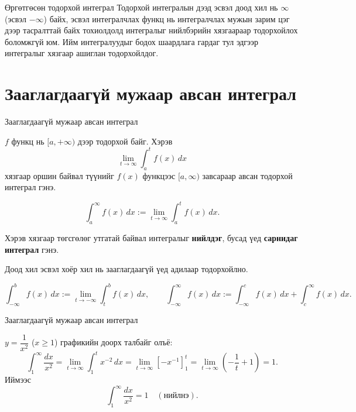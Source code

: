 

\begin{frame}[allowframebreaks]{Өргөтгөсөн тодорхой интеграл}
Тодорхой интегралын дээд эсвэл доод хил нь $\infty$ (эсвэл $-\infty$) байх, эсвэл 
интегралчлах функц нь интегралчлах мужын зарим цэг дээр тасралттай байх 
тохиолдолд интегралыг нийлбэрийн хязгаараар тодорхойлох боломжгүй юм. 
Ийм интегралуудыг бодох шаардлага гардаг тул эдгээр интегралыг хязгаар ашиглан тодорхойлдог.
\end{frame}

\section{Зааглагдаагүй мужаар авсан интеграл}
\begin{frame}[allowframebreaks]{Зааглагдаагүй мужаар авсан интеграл}
\begin{definition}
$f$ функц нь $[a,+\infty)$ дээр тодорхой байг. Хэрэв
\[
\lim_{t\to\infty}\int_a^{t} f(x)\,dx
\]
хязгаар оршин байвал түүнийг $f(x)$ функцээс $[a,\infty)$ завсараар авсан тодорхой интеграл гэнэ.  

\[
\int_a^{\infty} f(x)\,dx := \lim_{t\to\infty}\int_a^{t}f(x)\,dx.
\]

Хэрэв хязгаар төгсгөлөг утгатай байвал интегралыг \textbf{нийлдэг}, бусад үед \textbf{сарнидаг интеграл} гэнэ.
\end{definition}

Доод хил эсвэл хоёр хил нь зааглагдаагүй үед адилаар тодорхойлно.

\[
\int_{-\infty}^{b} f(x)\,dx := \lim_{t\to -\infty}\int_t^{b}f(x)\,dx,
\qquad
\int_{-\infty}^{\infty} f(x)\,dx := 
\int_{-\infty}^{c} f(x)\,dx + \int_{c}^{\infty} f(x)\,dx.
\]
\end{frame}

\begin{frame}[allowframebreaks]{Зааглагдаагүй мужаар авсан интеграл}
\begin{example}\label{x^{-2}}
$y=\dfrac{1}{x^2}$ ($x\ge1$) графикийн доорх талбайг олъё:
\[
\int_{1}^{\infty} \frac{dx}{x^2}
= \lim_{t\to\infty}\int_{1}^{t} x^{-2}\,dx
= \lim_{t\to\infty}\left[-x^{-1}\right]_{1}^{t}
= \lim_{t\to\infty}\left( -\frac{1}{t} + 1\right)
= 1.
\]
Иймээс
\[
\int_{1}^{\infty}\frac{dx}{x^2} = 1 \quad (\text{нийлнэ}).
\]
\end{example}
\end{frame}

